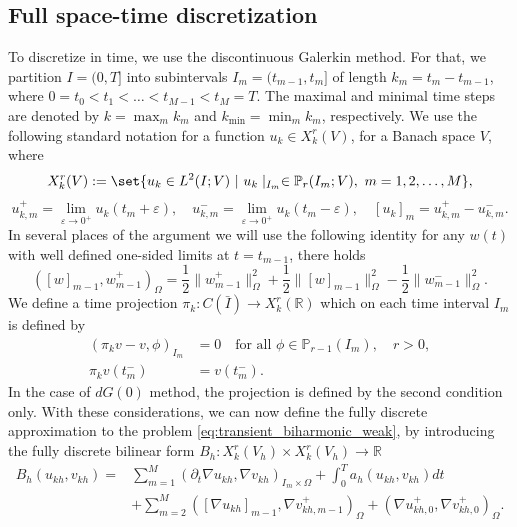 \documentclass{m2an}
\newcommand{\1}{\mathds{1}}
\newcommand{\R}{\mathbb{R}}
\newcommand{\Om}{\Omega}
\renewcommand{\textforall}{\text{for all }}
\newcommand{\na}{\nabla}
\theoremstyle{definition}
\begin{document}
  \subsection{Full space-time discretization}
\label{sec: full discretization}  
To discretize in time, 
we use the discontinuous Galerkin method.
For that, we partition $I = (0,T]$ into subintervals $I_m = (t_{m-1},t_m]$ of length $k_m = t_m - t_{m-1}$, where $0= t_0<t_1<\dots <t_{M-1}<t_M = T$. The maximal and minimal time steps are denoted by $k=\max_m k_m$ and $k_{\min}=\min_mk_m$, respectively.  
We use the following standard notation for a function $u_k \in X_{k}^r(V)$, for a Banach space $V$, where
$$
X_{k}^r(V):=\set{u_k\in L^2(I;V)\ |\ u_k\mid_{I_m}\in \mathbb{P}_r(I_m;V),\ m=1,2,\dots,M },
$$
\begin{equation}
u_{k,m}^+ = \lim_{\varepsilon \rightarrow 0^+}u_k(t_m+\varepsilon), \quad u_{k,m}^- = \lim_{\varepsilon \rightarrow 0^+}u_k(t_m-\varepsilon),\quad [u_k]_m = u_{k,m}^+-u_{k,m}^-.
\end{equation}
In several places of the argument we will use the following identity for any $w(t)$ 
with well defined 
one-sided limits at $t=t_{m-1}$, there holds
\begin{equation}\label{eq:jump_identity}
([w]_{m-1}, w_{m-1}^+)_{\Omega}= \frac{1}{2}\|w_{m-1}^+\|^2_{\Om}+\frac{1}{2}\| [w]_{m-1}\|^2_{\Om}-\frac{1}{2}\|w_{m-1}^-\|^2_{\Om}.
\end{equation}
We define a time projection $\pi_k\colon C(\bar{I})\to X_k^r(\R)$ which on each time interval $I_m$ is defined by
\begin{equation}\label{eq: projection pik}
\begin{aligned}
(\pi_k v-v,\phi)_{I_m}&=0\quad \textforall \phi\in \mathbb{P}_{r-1}(I_m),\quad r>0,\\
\pi_k v(t_m^-)&=v(t_m^-).
\end{aligned}
\end{equation}
In the case of $dG(0)$ method, the projection is defined by the second condition only. 
With these considerations, we can now define the fully discrete approximation to the problem
  \eqref{eq:transient_biharmonic_weak}, by introducing the fully discrete bilinear form
  $B_h\colon X_{k}^r(V_h)\times X_{k}^r(V_h)\to \mathbb{R}$
\begin{equation}\label{eq: fully discrete bilinear form}
  \begin{aligned}
    {B}_h(u_{kh},v_{kh}) = & \sum_{m=1}^M (\partial_t \nabla u_{kh}, \nabla v_{kh} )_{I_m\times \Omega} 
   + \int_0^Ta_h( u_{kh}, v_{kh}) dt\\
   & + \sum_{m=2}^M ([\nabla u_{kh}]_{m-1},\na v_{kh,m-1}^+)_{\Omega} + (\na u_{kh,0}^+,\na v_{kh,0}^+)_{\Omega}.
 \end{aligned}
\end{equation}
\end{document}
